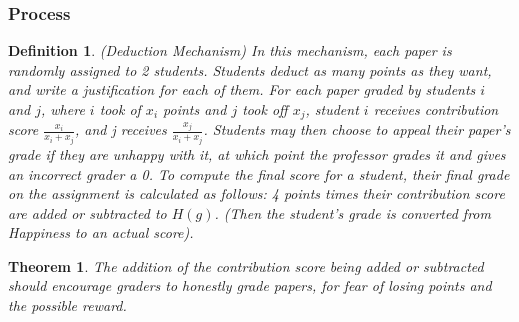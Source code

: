 \documentclass[12pt, Arial]{article}
\newtheorem{theorem}{Theorem}
\newtheorem{definition}{Definition}
\begin{document}
\subsubsection{Process}
\begin{definition}(Deduction Mechanism)
In this mechanism, each paper is randomly assigned to 2 students. Students deduct as many points as they want, and write a justification for each of them. For each paper graded by students $i$ and $j$, where $i$ took of $x_i$ points and $j$ took off $x_j$, student $i$ receives contribution score $\frac{x_i}{x_i + x_j}$, and j receives $\frac{x_j}{x_i + x_j}$. Students may then choose to appeal their paper's grade if they are unhappy with it, at which point the professor grades it and gives an incorrect grader a 0. To compute the final score for a student, their final grade on the assignment is calculated as follows: 4 points times their contribution score are added or subtracted to $H(g)$. (Then the student’s grade is converted from Happiness to an actual score).
\end{definition}
\begin{theorem}
The addition of the contribution score being added or subtracted should encourage graders to honestly grade papers, for fear of losing points and the possible reward.
\end{theorem}
\end{document}
